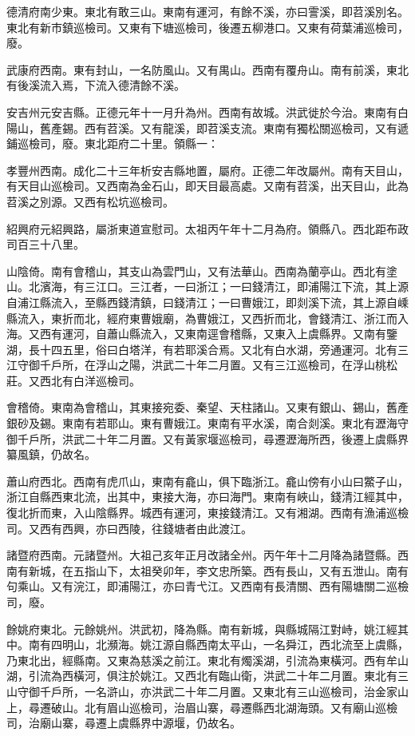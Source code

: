 德清府南少東。東北有敢三山。東南有運河，有餘不溪，亦曰霅溪，即苕溪別名。東北有新市鎮巡檢司。又東有下塘巡檢司，後遷五柳港口。又東有荷葉浦巡檢司，廢。

武康府西南。東有封山，一名防風山。又有禺山。西南有覆舟山。南有前溪，東北有後溪流入焉，下流入德清餘不溪。

安吉州元安吉縣。正德元年十一月升為州。西南有故城。洪武徙於今治。東南有白陽山，舊產錫。西有苕溪。又有龍溪，即苕溪支流。東南有獨松關巡檢司，又有遞鋪巡檢司，廢。東北距府二十里。領縣一：

孝豐州西南。成化二十三年析安吉縣地置，屬府。正德二年改屬州。南有天目山，有天目山巡檢司。又西南為金石山，即天目最高處。又南有苕溪，出天目山，此為苕溪之別源。又西有松坑巡檢司。

紹興府元紹興路，屬浙東道宣慰司。太祖丙午年十二月為府。領縣八。西北距布政司百三十八里。

山陰倚。南有會稽山，其支山為雲門山，又有法華山。西南為蘭亭山。西北有塗山。北濱海，有三江口。三江者，一曰浙江；一曰錢清江，即浦陽江下流，其上源自浦江縣流入，至縣西錢清鎮，曰錢清江；一曰曹娥江，即剡溪下流，其上源自嵊縣流入，東折而北，經府東曹娥廟，為曹娥江，又西折而北，會錢清江、浙江而入海。又西有運河，自蕭山縣流入，又東南逕會稽縣，又東入上虞縣界。又南有鑒湖，長十四五里，俗曰白塔洋，有若耶溪合焉。又北有白水湖，旁通運河。北有三江守御千戶所，在浮山之陽，洪武二十年二月置。又有三江巡檢司，在浮山桃松莊。又西北有白洋巡檢司。

會稽倚。東南為會稽山，其東接宛委、秦望、天柱諸山。又東有銀山、錫山，舊產銀砂及錫。東南有若耶山。東有曹娥江。東南有平水溪，南合剡溪。東北有瀝海守御千戶所，洪武二十年二月置。又有黃家堰巡檢司，尋遷瀝海所西，後遷上虞縣界纂風鎮，仍故名。

蕭山府西北。西南有虎爪山，東南有龕山，俱下臨浙江。龕山傍有小山曰鱉子山，浙江自縣西東北流，出其中，東接大海，亦曰海門。東南有峽山，錢清江經其中，復北折而東，入山陰縣界。城西有運河，東接錢清江。又有湘湖。西南有漁浦巡檢司。又西有西興，亦曰西陵，往錢塘者由此渡江。

諸暨府西南。元諸暨州。大祖己亥年正月改諸全州。丙午年十二月降為諸暨縣。西南有新城，在五指山下，太祖癸卯年，李文忠所築。西有長山，又有五泄山。南有句乘山。又有浣江，即浦陽江，亦曰青弋江。又西南有長清關、西有陽塘關二巡檢司，廢。

餘姚府東北。元餘姚州。洪武初，降為縣。南有新城，與縣城隔江對峙，姚江經其中。南有四明山，北瀕海。姚江源自縣西南太平山，一名舜江，西北流至上虞縣，乃東北出，經縣南。又東為慈溪之前江。東北有燭溪湖，引流為東橫河。西有牟山湖，引流為西橫河，俱注於姚江。又西北有臨山衛，洪武二十年二月置。東北有三山守御千戶所，一名滸山，亦洪武二十年二月置。又東北有三山巡檢司，治金家山上，尋遷破山。北有眉山巡檢司，治眉山寨，尋遷縣西北湖海頭。又有廟山巡檢司，治廟山寨，尋遷上虞縣界中源堰，仍故名。

